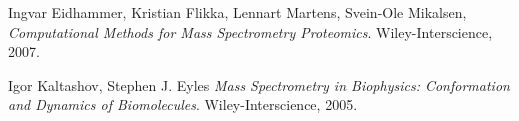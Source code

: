 \documentclass[xetex]{beamer}
\begin{document}

	
	    
	\begin{thebibliography}{10}

		\beamertemplatebookbibitems
		
			Ingvar Eidhammer, Kristian Flikka, Lennart Martens, Svein-Ole Mikalsen,
			\emph{Computational Methods for Mass Spectrometry Proteomics}.
			Wiley-Interscience, 
			2007.
			
			Igor Kaltashov, Stephen J. Eyles
			\emph{Mass Spectrometry in Biophysics: Conformation and Dynamics of Biomolecules}.
			Wiley-Interscience, 
			2005.	
				
	\end{thebibliography}	



\end{document}
